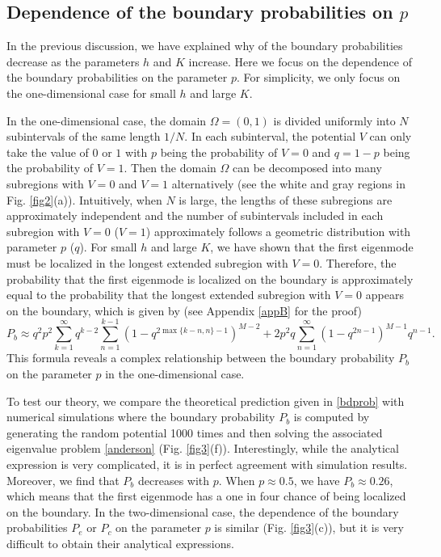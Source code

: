 \documentclass[a4paper,11pt]{article}
\begin{document}
\subsection{Dependence of the boundary probabilities on $p$}
In the previous discussion, we have explained why of the boundary probabilities decrease as the parameters $h$ and $K$ increase. Here we focus on the dependence of the boundary probabilities on the parameter $p$. For simplicity, we only focus on the one-dimensional case for small $h$ and large $K$.

In the one-dimensional case, the domain $\Omega = (0, 1)$ is divided uniformly into $N$ subintervals of the same length $1/N$. In each subinterval, the potential $V$ can only take the value of $0$ or $1$ with $p$ being the probability of $V = 0$ and $q = 1-p$ being the probability of $V = 1$. Then the domain $\Omega$ can be decomposed into many subregions with $V = 0$ and $V = 1$ alternatively (see the white and gray regions in Fig. \ref{fig2}(a)). Intuitively, when $N$ is large, the lengths of these subregions are approximately independent and the number of subintervals included in each subregion with $V = 0$ ($V = 1$) approximately follows a geometric distribution with parameter $p$ ($q$). For small $h$ and large $K$, we have shown that the first eigenmode must be localized in the longest extended subregion with $V = 0$. Therefore, the probability that the first eigenmode is localized on the boundary is approximately equal to the probability that the longest extended subregion with $V = 0$ appears on the boundary, which is given by (see Appendix \ref{appB} for the proof)
\begin{equation}\label{bdprob}
P_b \approx q^2 p^2 \sum_{k=1}^{\infty} q^{k-2} \sum_{n=1}^{k-1} (1 - q^{2 \max\{k-n,n\}-1})^{M-2} + 2 p^2 q \sum_{n=1}^{\infty} (1-q^{2n-1})^{M-1} q^{n-1}.
\end{equation}
This formula reveals a complex relationship between the boundary probability $P_b$ on the parameter $p$ in the one-dimensional case.

To test our theory, we compare the theoretical prediction given in \eqref{bdprob} with numerical simulations where the boundary probability $P_b$ is computed by generating the random potential 1000 times and then solving the associated eigenvalue problem \eqref{anderson} (Fig. \ref{fig3}(f)). Interestingly, while the analytical expression is very complicated, it is in perfect agreement with simulation results. Moreover, we find that $P_b$ decreases with $p$. When $p\approx 0.5$, we have $P_b\approx 0.26$, which means that the first eigenmode has a one in four chance of being localized on the boundary. In the two-dimensional case, the dependence of the boundary probabilities $P_e$ or $P_c$ on the parameter $p$ is similar (Fig. \ref{fig3}(c)), but it is very difficult to obtain their analytical expressions.
\end{document}
